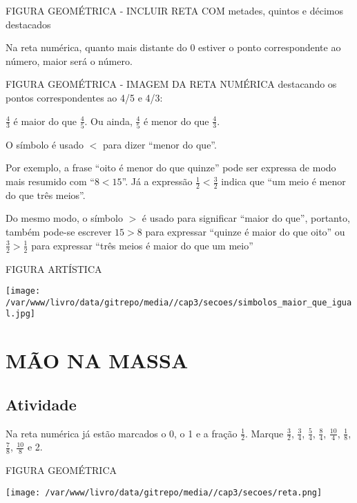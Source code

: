\documentclass[a4,12pt]{book}
\begin{document}
\begin{imagem*}[breakable]{}{}   FIGURA GEOMÉTRICA - INCLUIR RETA COM metades, quintos e décimos destacados \end{imagem*}

Na reta numérica, quanto mais distante do 0 estiver o ponto correspondente ao número, maior será o número. 

\begin{imagem*}[breakable]{}{}    FIGURA GEOMÉTRICA - IMAGEM DA RETA NUMÉRICA destacando os pontos correspondentes ao 4/5 e 4/3:  
  
\end{imagem*}

$\frac{4}{3}$ é maior do que $\frac{4}{5}$. Ou ainda, $\frac{4}{5}$ é menor do que $\frac{4}{3}$.


O símbolo é usado $<$ para dizer ``menor do que''.

Por exemplo, a frase ``oito é menor do que quinze'' pode ser expressa de modo mais resumido com ``$8<15$''. Já a expressão $\frac{1}{2}<\frac{3}{2}$ indica que ``um meio é menor do que três meios''.

Do mesmo modo, o símbolo $>$ é usado para significar ``maior do que'', portanto, também pode-se escrever $15>8$ para expressar ``quinze é maior do que oito'' ou $\frac{3}{2}>\frac{1}{2}$  para expressar ``três meios é maior do que um meio''

\begin{imagem*}[breakable]{}{}   FIGURA ARTÍSTICA  
  
    \texttt{[image: /var/www/livro/data/gitrepo/media//cap3/secoes/simbolos\_maior\_que\_igual.jpg]}   \end{imagem*}

\section{MÃO NA MASSA }

\subsection{Atividade}

Na reta numérica já estão marcados o 0, o 1 e a fração $\frac{1}{2}$. Marque $\frac{3}{2}$, $\frac{3}{4}$, $\frac{5}{4}$, $\frac{8}{4}$, $\frac{10}{4}$, $\frac{1}{8}$, $\frac{7}{8}$, $\frac{10}{8}$ e 2.
\begin{imagem*}[breakable]{}{}   FIGURA GEOMÉTRICA  
  
    \texttt{[image: /var/www/livro/data/gitrepo/media//cap3/secoes/reta.png]}  
\end{imagem*}
\end{document}
